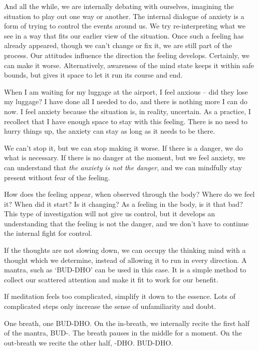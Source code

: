 And all the while, we are internally debating with ourselves, imagining
the situation to play out one way or another. The internal dialogue of
anxiety is a form of trying to control the events around us. We try
re-interpreting what we see in a way that fits our earlier view of the
situation. Once such a feeling has already appeared, though we can't
change or fix it, we are still part of the process. Our attitudes
influence the direction the feeling develops. Certainly, we can make it
worse. Alternatively, awareness of the mind state keeps it within safe
bounds, but gives it space to let it run its course and end.

When I am waiting for my luggage at the airport, I feel anxious -- did
they lose my luggage? I have done all I needed to do, and there is
nothing more I can do now. I feel anxiety because the situation is, in
reality, uncertain. As a practice, I recollect that I have enough space
to stay with this feeling. There is no need to hurry things up, the
anxiety can stay as long as it needs to be there.

We can't stop it, but we can stop making it worse. If there is a danger,
we do what is necessary. If there is no danger at the moment, but we
feel anxiety, we can understand that \emph{the anxiety is not the
danger}, and we can mindfully stay present without fear of the feeling.


How does the feeling appear, when observed through the body? Where do we
feel it? When did it start? Is it changing? As a feeling in the body, is
it that bad? This type of investigation will not give us control, but it
develops an understanding that the feeling is not the danger, and we
don't have to continue the internal fight for control.

If the thoughts are not slowing down, we can occupy the thinking mind
with a thought which we determine, instead of allowing it to run in
every direction. A mantra, such as `BUD-DHO' can be used in this case.
It is a simple method to collect our scattered attention and make it fit
to work for our benefit.

If meditation feels too complicated, simplify it down to the essence.
Lots of complicated steps only increase the sense of unfamiliarity and
doubt.

One breath, one BUD-DHO. On the in-breath, we internally recite the
first half of the mantra, BUD-. The breath pauses in the middle for a
moment. On the out-breath we recite the other half, -DHO. BUD-DHO.

